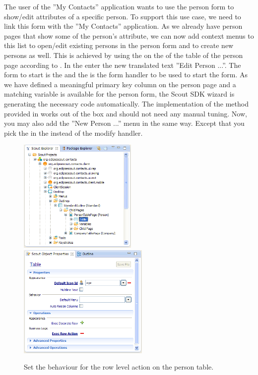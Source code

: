 \documentclass[a4paper,10pt,twoside]{book}
\begin{document}
The user of the ''My Contacts'' application wants to use the person form to show/edit attributes of a specific person.
To support this use case, we need to link this form with the ''My Contacts'' application. 
As we already have person pages that show some of the person's attribute, we can now add context menus to this list to open/edit existing persons in the person form and to create new persons as well. 
This is achieved by using the  on the  of the table of the person page according to . 
In the  enter the new translated text ''Edit Person ...''. 
The form to start is the  and the  is the form handler to be used to start the form. 
As we have defined a meaningful primary key column on the person page and a matching variable is available for the person form, the Scout SDK wizard is generating the necessary code automatically. 
The implementation of the  method provided in  works out of the box and should not need any manual tuning.
Now, you may also add the ''New Person ...'' menu in the same way. 
Except that you pick the  in the  instead of the modify handler. 

\begin{figure}
\includegraphics[height=5.5cm]{person_table_explorer.png} \hspace{5mm}
\includegraphics[height=5.5cm]{person_table_properties.png}
\caption{Set the behaviour for the row level action on the person table.}
\end{figure}
\end{document}
